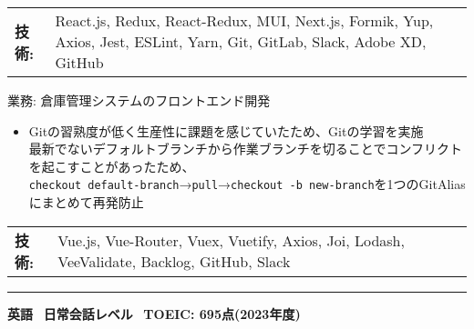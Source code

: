 \documentclass{article}
\begin{document}
\noindent
\begin{tabular}{@{}l l}
\textbf{技術:} & \parbox[t]{\dimexpr\linewidth-6em\relax}{
  React.js, Redux, React-Redux, MUI, Next.js, Formik, Yup, Axios, Jest, ESLint, Yarn, Git, GitLab, Slack, Adobe XD, GitHub
}
\end{tabular}

\vspace{0.5em}

\noindent 業務: 倉庫管理システムのフロントエンド開発

\begin{itemize}[leftmargin=1em]

  \item Gitの習熟度が低く生産性に課題を感じていたため、Gitの学習を実施\\
  最新でないデフォルトブランチから作業ブランチを切ることでコンフリクトを起こすことがあったため、\\
  \texttt{checkout default-branch}→\texttt{pull}→\texttt{checkout -b new-branch}を1つのGitAliasにまとめて再発防止

\end{itemize}

\noindent
\begin{tabular}{@{}l l}
\textbf{技術:} & \parbox[t]{\dimexpr\linewidth-6em\relax}{
  Vue.js, Vue-Router, Vuex, Vuetify, Axios, Joi, Lodash, VeeValidate, Backlog, GitHub, Slack
}
\end{tabular}

\vspace{0.25em}
\noindent\rule{\linewidth}{0.4pt}
\vspace{0.25em}

\noindent
\textbf{\large 英語} \textbar\
\textbf{日常会話レベル} \textbar\
\textbf{TOEIC: 695点(2023年度)}
\end{document}
